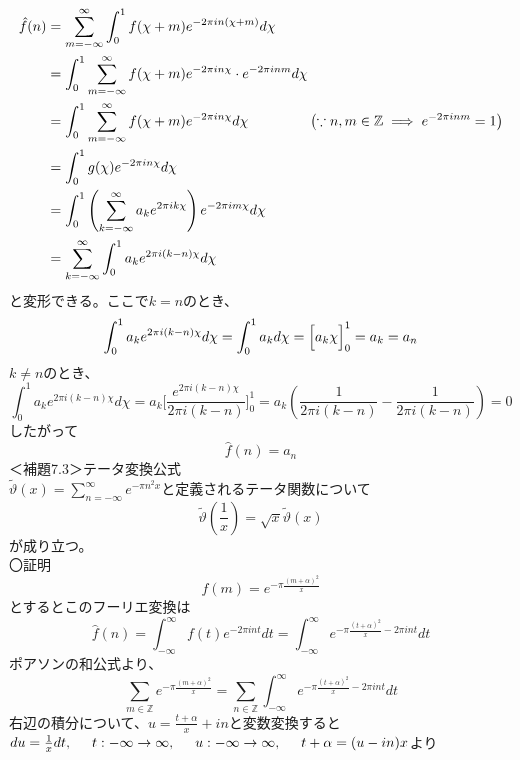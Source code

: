 \documentclass{jsarticle}
\begin{document}
\begin{align*}
\hat{f}(n)&=\sum_{m=-\infty}^{\infty}\int_{0}^{1}f(\chi+m)e^{-2\pi in(\chi+m)}d\chi\\
&=\int_{0}^{1}\sum_{m=-\infty}^{\infty}f(\chi+m)e^{-2\pi in\chi}\cdot e^{-2\pi inm}d\chi\\
&=\int_{0}^{1}\sum_{m=-\infty}^{\infty}f(\chi+m)e^{-2\pi in\chi}d\chi\hspace{15mm}\left(\because n,m\in\mathbb{Z}\hspace{1mm}\Longrightarrow\hspace{1mm}e^{-2\pi inm}=1\right)\\
&=\int_{0}^{1}g(\chi)e^{-2\pi in\chi}d\chi\\
&=\int_{0}^{1}\left(\sum_{k=-\infty}^{\infty}a_{k}e^{2\pi ik\chi}\right)e^{-2\pi im\chi}d\chi\\
&=\sum_{k=-\infty}^{\infty}\int_{0}^{1}a_{k}e^{2\pi i(k-n)\chi}d\chi
\end{align*}
と変形できる。ここで\(k=n\)のとき、
\begin{equation*}
\int_{0}^{1}a_{k}e^{2\pi i(k-n)\chi}d\chi=\int_{0}^{1}a_{k}d\chi=\Bigl[a_{k}\chi\Bigr]_{0}^{1}=a_{k}=a_{n}
\end{equation*}
\(k\neq n\)のとき、
\[\int_{0}^{1}a_{k}e^{2\pi i(k-n)\chi}d\chi=a_{k}\Biggl[\frac{e^{2\pi i(k-n)\chi}}{2\pi i(k-n)}\Biggr]_{0}^{1}=a_{k}\left(\frac{1}{2\pi i(k-n)}-\frac{1}{2\pi i(k-n)}\right)=0\]
したがって
\[\hat{f}(n)=a_{n}\]
＜補題7.3＞テータ変換公式\\
\(\displaystyle\tilde{\vartheta}(x)=\sum_{n=-\infty}^{\infty}e^{-\pi n^{2}x}\)と定義されるテータ関数について
\begin{equation}
\tilde{\vartheta}\left(\frac{1}{x}\right)=\sqrt{x}\tilde{\vartheta}(x)
\end{equation}
が成り立つ。\\
〇証明\\
\[f(m)=e^{-\pi\frac{(m+\alpha)^2}{x}}\]
とするとこのフーリエ変換は
\[\hat{f}(n)=\int_{-\infty}^{\infty}f(t)e^{-2\pi int}dt=\int_{-\infty}^{\infty}e^{-\pi\frac{(t+\alpha)^2}{x}-2\pi int}dt\]
ポアソンの和公式より、
\begin{equation}
\sum_{m\in\mathbb{Z}}e^{-\pi\frac{(m+\alpha)^2}{x}}=\sum_{n\in\mathbb{Z}}\int_{-\infty}^{\infty}e^{-\pi\frac{(t+\alpha)^2}{x}-2\pi int}dt
\end{equation}
右辺の積分について、\(u=\frac{t+\alpha}{x}+in\)と変数変換すると\\
\(du=\frac{1}{x}dt,\hspace{5mm}t:-\infty\to\infty,\hspace{5mm}u:-\infty\to\infty,\hspace{5mm}t+\alpha=(u-in)x\)より\\
\end{document}
